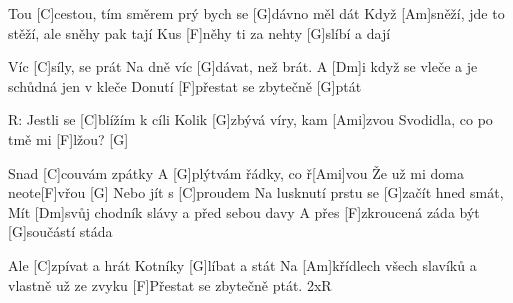 
Tou [C]cestou, tím směrem prý bych se [G]dávno měl dát 
Když [Am]sněží, jde to stěží, ale sněhy pak tají 
Kus [F]něhy ti za nehty [G]slíbí a dají

Víc [C]síly, se prát
Na dně víc [G]dávat, než brát.
A [Dm]i když se vleče a je schůdná jen v kleče
Donutí [F]přestat se zbytečně [G]ptát

R: Jestli se [C]blížím k cíli
Kolik [G]zbývá víry, kam [Ami]zvou
Svodidla, co po tmě mi [F]lžou? [G]

Snad [C]couvám zpátky
A [G]plýtvám řádky, co ř[Ami]vou
Že už mi doma neote[F]vřou [G]
\slpc
Nebo jít s [C]proudem
Na lusknutí prstu se [G]začít hned smát, 
Mít [Dm]svůj chodník slávy a před sebou davy 
A přes [F]zkroucená záda být [G]součástí stáda

Ale [C]zpívat a hrát
Kotníky [G]líbat a stát
Na [Am]křídlech všech slavíků a vlastně už ze zvyku
[F]Přestat se zbytečně ptát. 2xR


